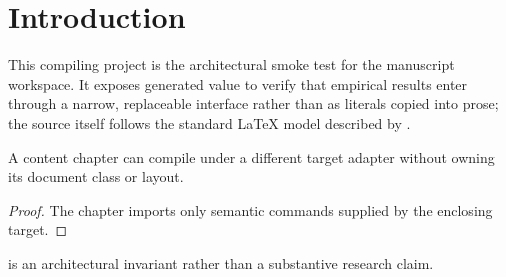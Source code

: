 \section{Introduction}\label{sec:introduction}

This compiling project is the architectural smoke test for the manuscript workspace.
It exposes  generated value to verify that empirical
results enter
through a narrow, replaceable interface rather than as literals copied into prose; the
source itself follows the standard LaTeX model described by \citet{lamport1994latex}.

\begin{proposition}\label{prop:separation}
  A content chapter can compile under a different target adapter without owning its
  document class or layout.
\end{proposition}

\begin{proof}
  The chapter imports only semantic commands supplied by the enclosing target.
\end{proof}

 is an architectural invariant rather than a substantive research
claim.
